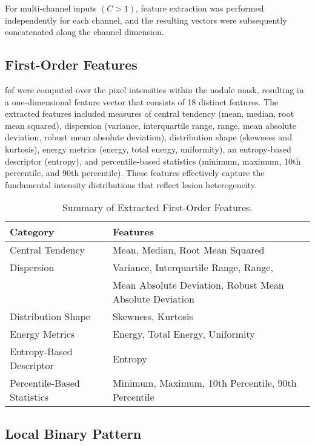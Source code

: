 For multi-channel inputs $(C > 1)$, feature extraction was performed independently for each channel, and the resulting vectors were subsequently concatenated along the channel dimension.

\subsection*{First-Order Features}

\acf{fof} were computed over the pixel intensities within the nodule mask, resulting in a one-dimensional feature vector that consists of 18 distinct features. The extracted features included measures of central tendency (mean, median, root mean squared), dispersion (variance, interquartile range, range, mean absolute deviation, robust mean absolute deviation), distribution shape (skewness and kurtosis), energy metrics (energy, total energy, uniformity), an entropy-based descriptor (entropy), and percentile-based statistics (minimum, maximum, 10th percentile, and 90th percentile). These features effectively capture the fundamental intensity distributions that reflect lesion heterogeneity.

\begin{table}[ht]
\centering
\caption{Summary of Extracted First-Order Features.}
\begin{tabular}{ll}
\hline
\textbf{Category}             & \textbf{Features} \\
\hline
Central Tendency              & Mean, Median, Root Mean Squared \\
Dispersion                    & Variance, Interquartile Range, Range, \\
                              & Mean Absolute Deviation, Robust Mean Absolute Deviation \\
Distribution Shape            & Skewness, Kurtosis \\
Energy Metrics                & Energy, Total Energy, Uniformity \\
Entropy-Based Descriptor      & Entropy \\
Percentile-Based Statistics   & Minimum, Maximum, 10th Percentile, 90th Percentile \\
\hline
\end{tabular}
\label{tab:fof_features}
\end{table}

\subsection*{Local Binary Pattern}

